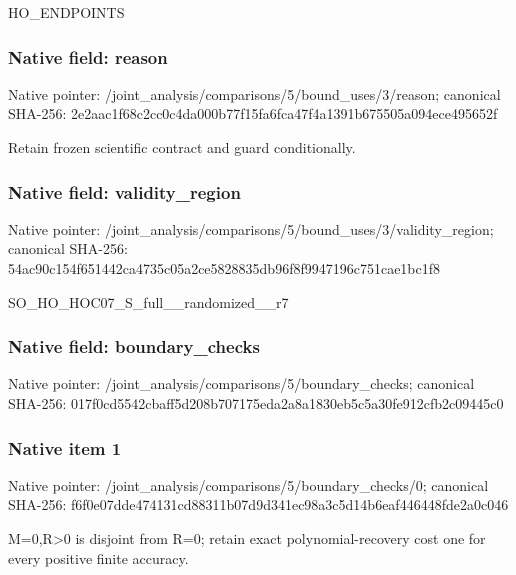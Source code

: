 \documentclass[10pt,a4paper]{article}
\begin{document}
\begingroup\raggedright\sloppy HO\_\allowbreak{}ENDPOINTS\par\endgroup

\subsubsection{Native field: reason}
Native pointer: /joint\_\allowbreak{}analysis/comparisons/5/bound\_\allowbreak{}uses/3/reason; canonical SHA-256: 2e2aac1f68c2cc0c4da000b77f15fa6fca47f4a1391b675505a094ece495652f

\begingroup\raggedright\sloppy Retain frozen scientific contract and guard conditionally.\par\endgroup

\subsubsection{Native field: validity\_\allowbreak{}region}
Native pointer: /joint\_\allowbreak{}analysis/comparisons/5/bound\_\allowbreak{}uses/3/validity\_\allowbreak{}region; canonical SHA-256: 54ac90c154f651442ca4735c05a2ce5828835db96f8f9947196c751cae1bc1f8

\begingroup\raggedright\sloppy SO\_\allowbreak{}HO\_\allowbreak{}HOC07\_\allowbreak{}S\_\allowbreak{}full\_\allowbreak{}\_\allowbreak{}randomized\_\allowbreak{}\_\allowbreak{}r7\par\endgroup

\subsubsection{Native field: boundary\_\allowbreak{}checks}
Native pointer: /joint\_\allowbreak{}analysis/comparisons/5/boundary\_\allowbreak{}checks; canonical SHA-256: 017f0cd5542cbaff5d208b707175eda2a8a1830eb5c5a30fe912cfb2c09445c0

\subsubsection{Native item 1}
Native pointer: /joint\_\allowbreak{}analysis/comparisons/5/boundary\_\allowbreak{}checks/0; canonical SHA-256: f6f0e07dde474131cd88311b07d9d341ec98a3c5d14b6eaf446448fde2a0c046

\begingroup\raggedright\sloppy M=\allowbreak{}0,\allowbreak{}R>0 is disjoint from R=\allowbreak{}0;\allowbreak{} retain exact polynomial-recovery cost one for every positive finite accuracy.\par\endgroup
\end{document}
